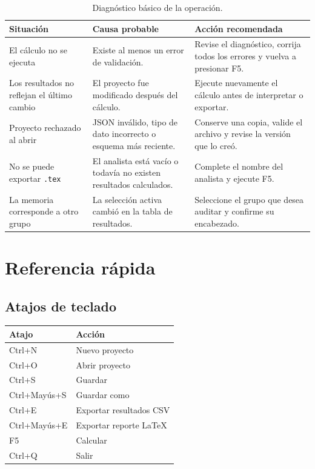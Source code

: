 \documentclass[11pt,letterpaper,oneside,openany]{report}
\begin{document}
\begin{table}[H]
\centering
\caption{Diagnóstico básico de la operación.}
\label{tab:problemas}
\begin{tabularx}{\textwidth}{@{}L{4.0cm}L{5.0cm}Y@{}}
\toprule
{}
\textbf{Situación} & \textbf{Causa probable} & \textbf{Acción recomendada} \\
\midrule
El cálculo no se ejecuta & Existe al menos un error de validación. & Revise el
diagnóstico, corrija todos los errores y vuelva a presionar F5. \\
Los resultados no reflejan el último cambio & El proyecto fue modificado después
del cálculo. & Ejecute nuevamente el cálculo antes de interpretar o exportar. \\
Proyecto rechazado al abrir & JSON inválido, tipo de dato incorrecto o esquema más
reciente. & Conserve una copia, valide el archivo y revise la versión que lo creó. \\
No se puede exportar \texttt{.tex} & El analista está vacío o todavía no existen
resultados calculados. & Complete el nombre del analista y ejecute F5. \\
La memoria corresponde a otro grupo & La selección activa cambió en la tabla de
resultados. & Seleccione el grupo que desea auditar y confirme su encabezado. \\
\bottomrule
\end{tabularx}
\end{table}

\appendix
\chapter{Referencia rápida}

\section{Atajos de teclado}

\begin{tabularx}{\textwidth}{@{}L{4.0cm}Y@{}}
\toprule
{}
\textbf{Atajo} & \textbf{Acción} \\
\midrule
Ctrl+N & Nuevo proyecto \\
Ctrl+O & Abrir proyecto \\
Ctrl+S & Guardar \\
Ctrl+Mayús+S & Guardar como \\
Ctrl+E & Exportar resultados CSV \\
Ctrl+Mayús+E & Exportar reporte LaTeX \\
F5 & Calcular \\
Ctrl+Q & Salir \\
\bottomrule
\end{tabularx}
\end{document}
